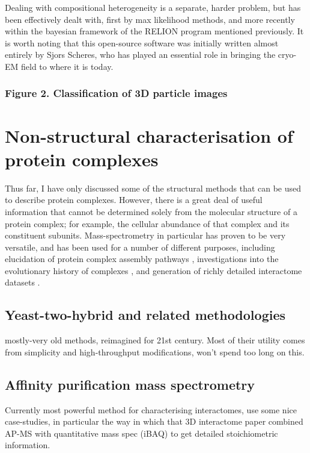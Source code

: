 \documentclass[a4paper,11pt,twoside,openright]{scrbook}
\let\cite\supercite
\begin{document}
Dealing with compositional heterogeneity is a separate, harder problem, but has been effectively dealt with, first by max likelihood methods, and more recently within the bayesian framework of the RELION program mentioned previously. It is worth noting that this open-source software was initially written almost entirely by Sjors Scheres, who has played an essential role in bringing the cryo-EM field to where it is today.

\subsubsection{Figure 2. Classification of 3D particle images}

\section{Non-structural characterisation of protein complexes}
Thus far, I have only discussed some of the structural methods that can be used to describe protein complexes. However, there is a great deal of useful information that cannot be determined solely from the molecular structure of a protein complex; for example, the cellular abundance of that complex and its constituent subunits. Mass-spectrometry in particular has proven to be very versatile, and has been used for a number of different purposes, including elucidation of protein complex assembly pathways \cite{Levy2008a,Marsh2013}, investigations into the evolutionary history of complexes \cite{Wan2015}, and generation of richly detailed interactome datasets \cite{Hein2015}.

\subsection{Yeast-two-hybrid and related methodologies}
mostly-very old methods, reimagined for 21st century. Most of their utility comes from simplicity and high-throughput modifications, won't spend too long on this.

\subsection{Affinity purification mass spectrometry}
Currently most powerful method for characterising interactomes, use some nice case-studies, in particular the way in which that 3D interactome paper \cite{Hein2015} combined AP-MS with quantitative mass spec (iBAQ) to get detailed stoichiometric information.
\end{document}
